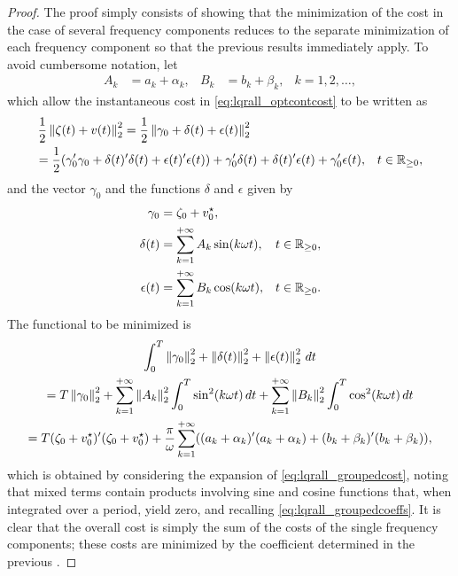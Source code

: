\begin{proof}
  The proof simply consists of showing that the minimization of the cost in the case of several frequency components reduces to the separate minimization of each frequency component so that the previous results immediately apply. To avoid cumbersome notation, let
	\begin{align}
		\label{eq:lqrall_groupedcoeffs}
		A_k &= a_k + \alpha_k, & B_k &= b_k + \beta_k, & k = 1,2,\dotsc,
	\end{align}
	which allow the instantaneous cost in \eqref{eq:lqrall_optcontcost} to be written as
	\begin{align}
		\label{eq:lqrall_groupedcost}
		&\frac{1}{2} \left\Vert \zeta(t) + v(t) \right\Vert^2_2 = \frac{1}{2} \left\Vert \gamma_0 + \delta(t) + \epsilon(t) \right\Vert^2_2&\notag\\
    &\hspace{-2pt}= \frac{1}{2}(\gamma_0'\gamma_0 + \delta(t)'\delta(t) + \epsilon(t)'\epsilon(t)) + \gamma_0'\delta(t) + \delta(t)'\epsilon(t) + \gamma_0'\epsilon(t), & t\in\mathbb{R}_{\geq 0},
	\end{align}
	and the vector $\gamma_0$ and the functions $\delta$ and $\epsilon$ given by
	\begin{subequations}
		\begin{align}
			\gamma_0  & = \zeta_0 + v^{\star}_0, \\
			\delta(t) & = \sum_{k=1}^{+\infty} A_k \sin(k \omega t), & t\in\mathbb{R}_{\geq 0}, \\
			\epsilon(t) & = \sum_{k=1}^{+\infty} B_k \cos(k \omega t), & t\in\mathbb{R}_{\geq 0}.
		\end{align}
	\end{subequations}
  The functional to be minimized is
  \begin{multline}
		\int_{0}^{T} \left\Vert\gamma_0\right\Vert^2_2 + \left\Vert\delta(t)\right\Vert^2_2 + \left\Vert \epsilon(t)\right\Vert^2_2\,dt \\
		=T\left\Vert\gamma_0\right\Vert^2_2 + \sum_{k=1}^{+\infty}\left\Vert A_k \right\Vert^2_2 \int_{0}^{T} \sin^2(k \omega t)\,dt + \sum_{k=1}^{+\infty}\left\Vert B_k \right\Vert^2_2 \int_{0}^{T} \cos^2(k \omega t)\,dt \\
		=T(\zeta_0 + v^{\star}_0)'(\zeta_0 + v^{\star}_0) + \frac{\pi}{\omega} \sum_{k=1}^{+\infty} ((a_k+\alpha_k)'(a_k+\alpha_k) + (b_k+\beta_k)'(b_k+\beta_k)),
	\end{multline}
  which is obtained by considering the expansion of \eqref{eq:lqrall_groupedcost}, noting that mixed terms contain products involving sine and cosine functions that, when integrated over a period, yield zero, and recalling \eqref{eq:lqrall_groupedcoeffs}.	It is clear that the overall cost is simply the sum of the costs of the single frequency components; these costs are minimized by the coefficient determined in the previous .
\end{proof}

